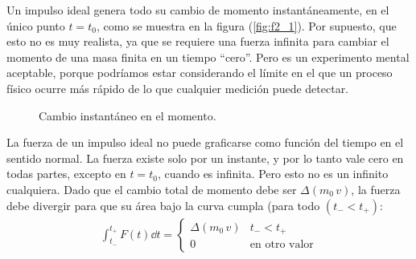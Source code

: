 Un impulso ideal genera todo su cambio de momento instantáneamente, en el único punto $t = t_{0}$, como se muestra en la figura (\ref{fig:f2_1}). Por supuesto, que esto no es muy realista, ya que se requiere una fuerza infinita para cambiar el momento de una masa finita en un tiempo \enquote{cero}. Pero es un experimento mental aceptable, porque podríamos estar considerando el límite en el que un proceso físico ocurre más rápido de lo que cualquier medición puede detectar.

\begin{figure}[H]
    \centering
{}
\caption{Cambio instantáneo en el momento.}
\end{figure}    

La fuerza de un impulso ideal no puede graficarse como función del tiempo en el sentido normal. La fuerza existe solo por un instante, y por lo tanto vale cero en todas partes, excepto en $t = t_{0}$, cuando es infinita. Pero esto no es un infinito cualquiera. Dado que el cambio total de momento debe ser $\Delta (m_{0} \, v)$, la fuerza debe divergir para que su área bajo la curva cumpla (para todo $(t_{-} < t_{+})$:
\begin{align}
\int_{t_{-}}^{t_{+}} F(t) \dd{t} = \begin{cases}
\Delta (m_{0} \, v) & t_{-} < t_{+} \\
0 & \mbox{en otro valor}
\end{cases}
\label{eq:ecuacion_05_02}
\end{align}

